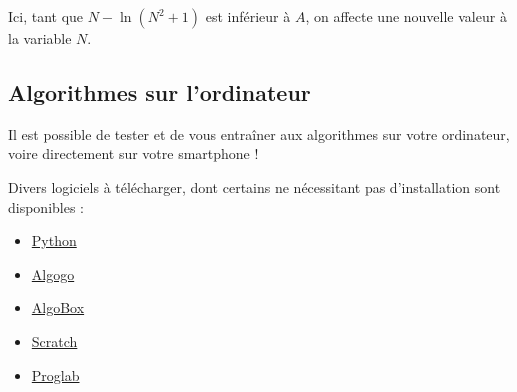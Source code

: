 	\begin{tip}
		Ici, tant que $N - \ln(N^2 + 1)$ est inférieur à $A$, on affecte une nouvelle valeur à la variable $N$.
	\end{tip}

	\begin{nosummary}
		\section{Algorithmes sur l'ordinateur}

		Il est possible de tester et de vous entraîner aux algorithmes sur votre ordinateur, voire directement sur votre smartphone !

		\begin{tip}
			Divers logiciels à télécharger, dont certains ne nécessitant pas d'installation sont disponibles :
			\begin{itemize}
				\item \href{https://python.org}{Python}
				\item \href{https://www.algogo.xyz}{Algogo}
				\item \href{http://www.xm1math.net/algobox/}{AlgoBox}
				\item \href{https://scratch.mit.edu/}{Scratch}
				\item \href{http://proglab.fr/}{Proglab}
			\end{itemize}
		\end{tip}
	\end{nosummary}


